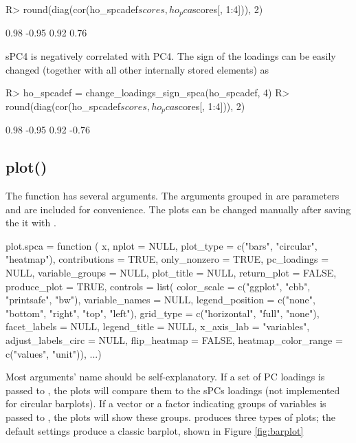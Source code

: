 \documentclass[article]{jss}
\newcommand{\fct}[1]{\code{#1()}}
\begin{document}
\begin{Schunk}
\begin{Sinput}
R>  round(diag(cor(ho_spcadef$scores, ho_pca$scores[, 1:4])), 2)
\end{Sinput}
\begin{Soutput}
[1]  0.98 -0.95  0.92  0.76
\end{Soutput}
\end{Schunk}
sPC4 is negatively correlated with PC4. The sign of the loadings can be easily changed (together with all other internally stored elements) as 
\begin{Schunk}
\begin{Sinput}
R> ho_spcadef = change_loadings_sign_spca(ho_spcadef, 4)
R> round(diag(cor(ho_spcadef$scores, ho_pca$scores[, 1:4])), 2)
\end{Sinput}
\begin{Soutput}
[1]  0.98 -0.95  0.92 -0.76
\end{Soutput}
\end{Schunk}
\subsection{plot()}
The function  has several arguments. The arguments grouped in  are  parameters and are included for convenience. The plots can be changed manually after saving the it with . 
\begin{Code}
plot.spca = function (
 x,
 nplot = NULL,
 plot_type = c("bars", "circular", "heatmap"),
 contributions = TRUE,
 only_nonzero = TRUE,
 pc_loadings = NULL,
 variable_groups = NULL,
 plot_title = NULL,
 return_plot = FALSE,
 produce_plot = TRUE,
 controls = list(
 color_scale = c("ggplot", "cbb", "printsafe", "bw"),
 variable_names = NULL,
 legend_position = c("none", "bottom", "right", "top", "left"),
 grid_type = c("horizontal", "full", "none"),
 facet_labels = NULL,
 legend_title = NULL,
 x_axis_lab = "variables",
 adjust_labels_circ = NULL,
 flip_heatmap = FALSE,
 heatmap_color_range = c("values", "unit")),
 ...) 
\end{Code}
Most arguments' name should be self-explanatory. If a set of PC loadings is passed to , the plots will compare them to the sPCs loadings (not implemented for circular barplots). If a vector or a factor indicating groups of variables is passed to , the plots will show these groups.
\fct{plot} produces three types of plots; the default settings produce a classic barplot, shown in Figure \ref{fig:barplot}
\end{document}
